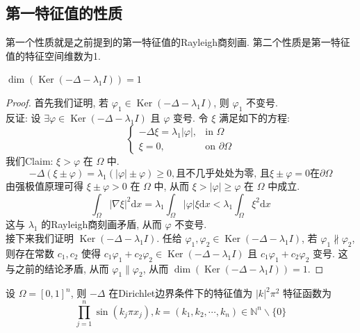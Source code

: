 \documentclass[11pt]{ctexart}[UTF8]
\begin{document}
\subsection{第一特征值的性质}
第一个性质就是之前提到的第一特征值的Rayleigh商刻画. 第二个性质是第一特征值的特征空间维数为1.
\begin{theorem}
    $\dim(\operatorname{Ker}(-\Delta - \lambda_1I)) = 1$
\end{theorem}
\begin{proof}
    首先我们证明, 若 $\varphi_{1} \in \operatorname{Ker}(-\Delta - \lambda_1I)$, 则 $\varphi_{1} $ 不变号.\\
    反证: 设 $\exists \varphi \in \operatorname{Ker}(-\Delta - \lambda_1I)$ 且 $\varphi$ 变号. 令 $\xi$ 满足如下的方程:
    \begin{equation*}
        \begin{cases}
            -\Delta \xi = \lambda_1 |\varphi|, & \text{in } \Omega\\
            \xi = 0, & \text{on }\partial \Omega
        \end{cases}
    \end{equation*}
    我们Claim: $\xi > \varphi$ 在 $\Omega$ 中.\\
    \begin{equation*}
        -\Delta (\xi \pm  \varphi) = \lambda_1 (|\varphi| \pm \varphi) \geq 0, \text{且不几乎处处为零, 且} \xi \pm \varphi = 0 \text{在} \partial \Omega
    \end{equation*}
    由强极值原理可得 $\xi \pm \varphi > 0$ 在 $\Omega$ 中, 从而 $\xi > |\varphi| \geq \varphi$ 在 $\Omega$ 中成立.
    \begin{equation*}
        \int_{\Omega} |\nabla \xi|^2 \mathrm{d}x = \lambda_1 \int_{\Omega} |\varphi| \xi \mathrm{d}x < \lambda_1 \int_{\Omega} \xi^2 \mathrm{d}x
    \end{equation*}
    这与 $\lambda_1$ 的Rayleigh商刻画矛盾, 从而 $\varphi$ 不变号.\\
接下来我们证明 $\operatorname{Ker}(-\Delta - \lambda_1I)$. 任给 $\varphi_{1}, \varphi_{2} \in \operatorname{Ker}(-\Delta - \lambda_1I)$, 若 $\varphi_{1} \nparallel \varphi_{2}$, 
则存在常数 $c_1, c_2$ 使得 $c_1 \varphi_{1} + c_2 \varphi_{2} \in \operatorname{Ker}(-\Delta - \lambda_1I)$ 且 $c_1 \varphi_{1} + c_2 \varphi_{2} $ 变号. 这与之前的结论矛盾, 从而 $\varphi_{1} \parallel \varphi_{2}$, 从而 $\dim(\operatorname{Ker}(-\Delta - \lambda_1I)) = 1$.
\end{proof}
\begin{example}
    设 $\Omega = [0,1]^n$, 则 $-\Delta$ 在Dirichlet边界条件下的特征值为 $|k|^2\pi^{2}$ 特征函数为 $$\prod\limits_{j=1}^{n} \sin(k_j \pi x_j), k = (k_1, k_2, \cdots, k_n) \in \mathbb{N}^n\backslash\{0\}$$
\end{example}
\end{document}
